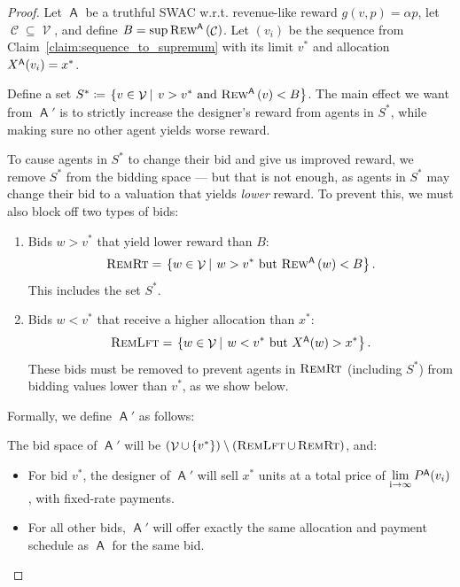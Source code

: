 \documentclass[11pt,letterpaper]{article}
\newcommand{\set}[1]{\left\{#1\right\}}
\newcommand{\brackets}[1]{\left( #1 \right)}
\newcommand{\fr}{fixed-rate\xspace}
\newcommand{\swac}{SWAC\xspace}
\newcommand \sett[2] { \left.\left\{{#1}\medspace\right\vert\medspace{#2}\right\}}
\DeclareMathOperator{\A}{\auc{A}}
\DeclareMathOperator{\C}{\mathcal{C}}
\DeclareMathOperator{\V}{\mathcal{V}}
\newcommand{\vstar}{{v^*}}
\newcommand{\xstar}{{x^*}}
\newcommand{\g}{g}
\DeclareMathOperator{\remrt}{\textsc{RemRt}}
\DeclareMathOperator{\remlft}{\textsc{RemLft}}
\DeclareMathOperator*{\mylim}{\lim\limits_{i\rightarrow\infty}}
\theoremstyle{plain}
\newcommand{\auc}[1]{\mathsf{#1}}
\begin{document}
\begin{proof} 


Let $\A$ be a truthful \swac w.r.t. revenue-like reward $\g(v,p)=\alpha p$, let $\C\subseteq\V$, and define $B=\sup \trew[\A]{\C}$. Let $\brackets{v_i}$ be the sequence from Claim~\ref{claim:sequence_to_supremum} with its limit $\vstar$ and allocation $\x[\A]{v_i}=\xstar$. 

Define a set $S^\ast\coloneq\sett{v\in\V}{v>\vstar\textnormal{ and }\trew[\A]{v}<B}$.
The main effect we want from $\A'$ is to strictly increase the designer's reward from agents in $S^\ast$, while making sure no other agent yields worse reward.


     To cause agents in $S^*$ to change their bid and give us improved reward,
     we remove $S^*$
     from the bidding space ---
     but that is not enough,
     as agents in $S^*$ may change their bid to a valuation that yields \emph{lower} reward.
     To prevent this,
     we
     must also block off two types of bids:
    \begin{enumerate}
        \item Bids $w > \vstar$ that yield lower reward than $B$:
           \begin{equation*}
            \remrt=\sett{w\in\V}{w>\vstar\textnormal{ but }\trew[\A]{w}< B}.
        \end{equation*}
        This includes the set $S^*$.
        \item Bids $w < \vstar$ that receive a higher allocation than $\xstar$:
        \begin{equation*}
            \remlft=\sett{w\in\V}{w<\vstar\textnormal{ but }\x[\A]{w} > \xstar}.
        \end{equation*}
        These bids must be removed to prevent agents in $\remrt$ (including $S^*$) from bidding values lower than $v^*$, as we show below. 
    \end{enumerate}

   Formally, we define $\A'$ as follows:

   The bid space of $\A'$ will be $\brackets{\V\cup\set{\vstar}}\setminus\brackets{\remlft\cup\remrt}$, and:
    \begin{itemize}
        \item For bid $\vstar$, the designer of $\A'$ will sell $\xstar$ units at a total price of $\mylim\p[\A]{v_i}$, with \fr payments.
        \item For all other bids, $\A'$ will offer exactly the same allocation and payment schedule as $\A$ for the same bid.
    \end{itemize}


\end{proof}
\end{document}
